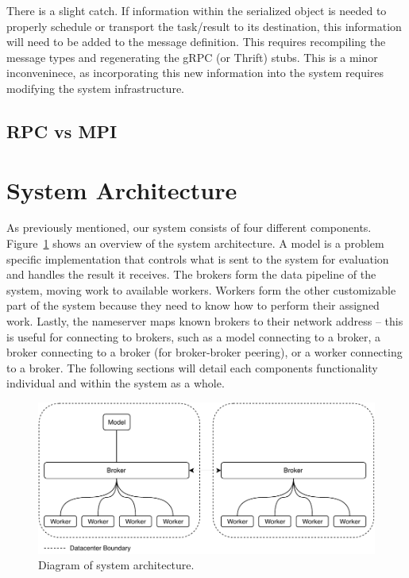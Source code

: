 \documentclass[conference]{IEEEtran}
\begin{document}
There is a slight catch. If information within the serialized object
is needed to properly schedule or transport the task/result to its
destination, this information will need to be added to the message
definition. This requires recompiling the message types and regenerating
the gRPC (or Thrift) stubs. This is a minor inconveninece, as incorporating
this new information into the system requires modifying the system
infrastructure.

\subsection{RPC vs MPI}

\section{System Architecture}
As previously mentioned, our system consists of four different components.
Figure~\ref{fig:sys-arch} shows an overview of the system architecture.
A model
is a problem specific implementation that controls what is sent to the system for
evaluation and handles the result it receives. The brokers form the data pipeline
of the system, moving work to available workers. Workers form the other customizable
part of the system because they need to know how to perform their assigned work.
Lastly, the nameserver maps known brokers to their network address -- this is useful
for connecting to brokers, such as a model connecting to a broker, a broker connecting
to a broker (for broker-broker peering), or a worker connecting to a broker. The
following sections will detail each components functionality individual and within
the system as a whole.

\begin{figure}
  \centering
  \includegraphics{img/broker-arch.pdf}
  \caption{Diagram of system architecture.}
  \label{fig:sys-arch}
\end{figure}
\end{document}

